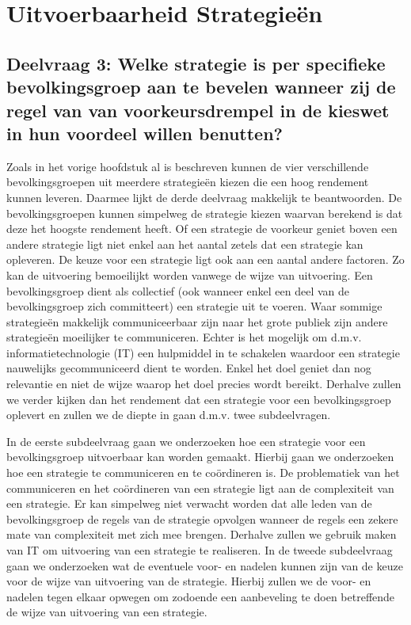 \newpage
\section{Uitvoerbaarheid Strategie\"{e}n}
\label{h6}

\subsection*{Deelvraag 3: Welke strategie is per specifieke bevolkingsgroep aan te bevelen wanneer zij de regel van van voorkeursdrempel in de kieswet in hun voordeel willen benutten?}
Zoals in het vorige hoofdstuk al is beschreven kunnen de vier verschillende bevolkingsgroepen uit meerdere strategie\"{e}n kiezen die een hoog rendement kunnen leveren. Daarmee lijkt de derde deelvraag makkelijk te beantwoorden. De bevolkingsgroepen kunnen simpelweg de strategie kiezen waarvan berekend is dat deze het hoogste rendement heeft. Of een strategie de voorkeur geniet boven een andere strategie ligt niet enkel aan het aantal zetels dat een strategie kan opleveren. De keuze voor een strategie ligt ook aan een aantal andere factoren. Zo kan de uitvoering bemoeilijkt worden vanwege de wijze van uitvoering. Een bevolkingsgroep dient als collectief (ook wanneer enkel een deel van de bevolkingsgroep zich committeert) een strategie uit te voeren. Waar sommige strategie\"{e}n makkelijk communiceerbaar zijn naar het grote publiek zijn andere strategie\"{e}n moeilijker te communiceren. Echter is het mogelijk om d.m.v. informatietechnologie (IT) een hulpmiddel in te schakelen waardoor een strategie nauwelijks gecommuniceerd dient te worden. Enkel het doel geniet dan nog relevantie en niet de wijze waarop het doel precies wordt bereikt. Derhalve zullen we verder kijken dan het rendement dat een strategie voor een bevolkingsgroep oplevert en zullen we de diepte in gaan d.m.v. twee subdeelvragen. 

In de eerste subdeelvraag gaan we onderzoeken hoe een strategie voor een bevolkingsgroep uitvoerbaar kan worden gemaakt. Hierbij gaan we onderzoeken hoe een strategie te communiceren en te co\"{o}rdineren is. De problematiek van het communiceren en het co\"{o}rdineren van een strategie ligt aan de complexiteit van een strategie. Er kan simpelweg niet verwacht worden dat alle leden van de bevolkingsgroep de regels van de strategie opvolgen wanneer de regels een zekere mate van complexiteit met zich mee brengen. Derhalve zullen we gebruik maken van IT om uitvoering van een strategie te realiseren. In de tweede subdeelvraag gaan we onderzoeken wat de eventuele voor- en nadelen kunnen zijn van de keuze voor de wijze van uitvoering van de strategie. Hierbij zullen we de voor- en nadelen tegen elkaar opwegen om zodoende een aanbeveling te doen betreffende de wijze van uitvoering van een strategie.  


